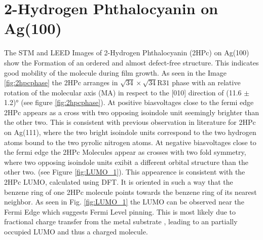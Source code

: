 \section{2-Hydrogen Phthalocyanin on Ag(100)}
\label{sec:results}The STM and LEED Images of 2-Hydrogen Phthalocyanin (2HPc) on Ag(100) show the Formation of an ordered and almost defect-free structure.
This indicates good mobility of the molecule during film growth.
As seen in the Image \ref{fig:2hpcphase} the 2HPc  arranges in $\sqrt{34} \times  \sqrt{34}\text{R}31$ phase with an relative rotation of the molecular axis (MA) in respect to the [010] direction of (11.6 $\pm$ 1.2)° (see figure \ref{fig:2hpcphase}). 
\noindent %
At positive biasvoltages close to the fermi edge 2HPc appears as a cross with two opposing isoindole unit seemingly brighter than the other two.
This is consistent with previous observation in literature for 2HPc on Ag(111), where the two bright isoindole units correspond to the two hydrogen atoms bound to the two pyrolic nitrogen atoms. \cite{sperl2011controlled}
At negative biasvoltages close to the fermi edge the 2HPc Molecules appear as crosses with two fold symmetry, where two opposing isoindole units exibit a different orbital structure than the other two. (see Figure \ref{fig:LUMO_1}).
This appearence is consistent with the 2HPc LUMO, calculated using DFT. \cite{database}
It is oriented in such a way that the benzene ring of one 2HPc molecule points towards the benzene ring of its nearest neighbor.
As seen in Fig. \ref{fig:LUMO_1} the LUMO can be observed near the Fermi Edge which suggests Fermi Level pinning.
\newpage
This is most likely due to fractional charge transfer from the metal substrate , leading to an partially occupied LUMO and thus a charged molecule.  
